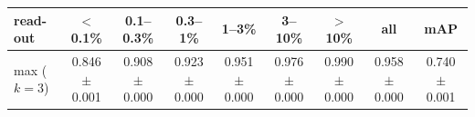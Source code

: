 \begin{tabular}{lcccccccc}
\toprule
read-out & $<$0.1\% & 0.1--0.3\% & 0.3--1\% & 1--3\% & 3--10\% & $>$10\% & all & mAP \\
\midrule
max ($k=3$) & 0.846 $\pm$ 0.001 & 0.908 $\pm$ 0.000 & 0.923 $\pm$ 0.000 & 0.951 $\pm$ 0.000 & 0.976 $\pm$ 0.000 & 0.990 $\pm$ 0.000 & 0.958 $\pm$ 0.000 & 0.740 $\pm$ 0.001 \\
\bottomrule
\end{tabular}
